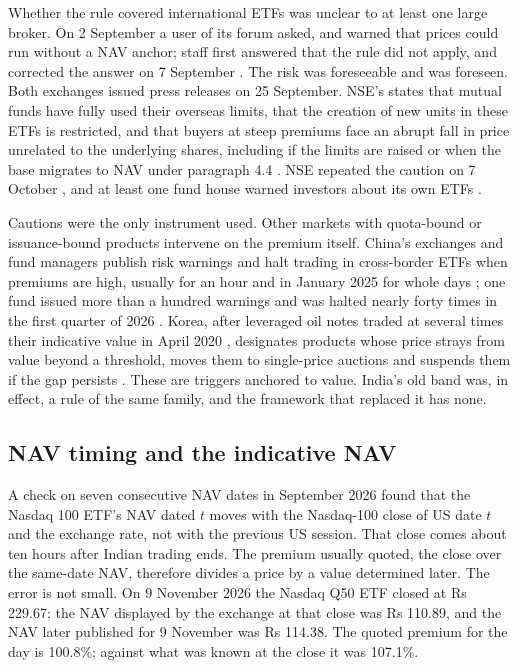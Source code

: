 \documentclass[10pt,journal,a4paper]{IEEEtran}
\theoremstyle{definition}
\begin{document}
Whether the rule covered international ETFs was unclear to at least one large broker. On 2 September a user of its forum asked, and warned that prices could run without a NAV anchor; staff first answered that the rule did not apply, and corrected the answer on 7 September \citep{zerodha2026forum}. The risk was foreseeable and was foreseen. Both exchanges issued press releases on 25 September. NSE's states that mutual funds have fully used their overseas limits, that the creation of new units in these ETFs is restricted, and that buyers at steep premiums face an abrupt fall in price unrelated to the underlying shares, including if the limits are raised or when the base migrates to NAV under paragraph 4.4 \citep{nse2026press,bse2026press}. NSE repeated the caution on 7 October \citep{reuters2026nse}, and at least one fund house warned investors about its own ETFs \citep{cafemutual2026mirae}.

Cautions were the only instrument used. Other markets with quota-bound or issuance-bound products intervene on the premium itself. China's exchanges and fund managers publish risk warnings and halt trading in cross-border ETFs when premiums are high, usually for an hour and in January 2025 for whole days \citep{bloomberg2025halts}; one fund issued more than a hundred warnings and was halted nearly forty times in the first quarter of 2026 \citep{yicai2026quota}. Korea, after leveraged oil notes traded at several times their indicative value in April 2020 \citep{asiae2020etn}, designates products whose price strays from value beyond a threshold, moves them to single-price auctions and suspends them if the gap persists \citep{fsc2020measures}. These are triggers anchored to value. India's old band was, in effect, a rule of the same family, and the framework that replaced it has none.

\subsection{NAV timing and the indicative NAV}
A check on seven consecutive NAV dates in September 2026 found that the Nasdaq 100 ETF's NAV dated $t$ moves with the Nasdaq-100 close of US date $t$ and the exchange rate, not with the previous US session. That close comes about ten hours after Indian trading ends. The premium usually quoted, the close over the same-date NAV, therefore divides a price by a value determined later. The error is not small. On 9 November 2026 the Nasdaq Q50 ETF closed at Rs 229.67; the NAV displayed by the exchange at that close was Rs 110.89, and the NAV later published for 9 November was Rs 114.38. The quoted premium for the day is 100.8\%; against what was known at the close it was 107.1\%.
\end{document}
